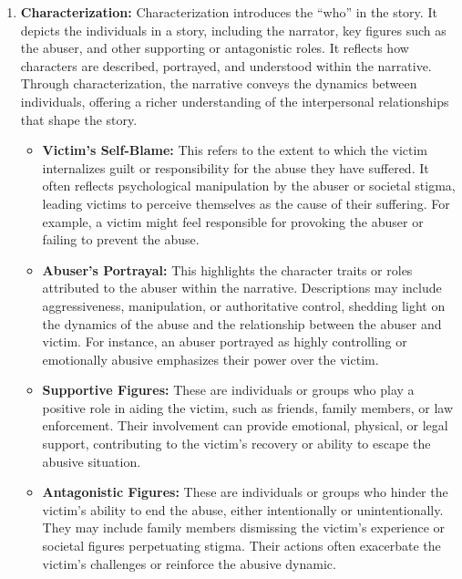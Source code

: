 \documentclass[11pt]{article}
\begin{document}
\begin{enumerate}
    \item \textbf{Characterization: }
    Characterization introduces the ``who'' in the story. 
    It depicts the individuals in a story, including the narrator, key figures such as the abuser, and other supporting or antagonistic roles. 
    It reflects how characters are described, portrayed, and understood within the narrative. 
    Through characterization, the narrative conveys the dynamics between individuals, offering a richer understanding of the interpersonal relationships that shape the story.
    \begin{itemize}
        \item \textbf{Victim's Self-Blame:} This refers to the extent to which the victim internalizes guilt or responsibility for the abuse they have suffered. 
        It often reflects psychological manipulation by the abuser or societal stigma, leading victims to perceive themselves as the cause of their suffering. 
        For example, a victim might feel responsible for provoking the abuser or failing to prevent the abuse.
        \item \textbf{Abuser's Portrayal:} This highlights the character traits or roles attributed to the abuser within the narrative.
        Descriptions may include aggressiveness, manipulation, or authoritative control, shedding light on the dynamics of the abuse and the relationship between the abuser and victim. 
        For instance, an abuser portrayed as highly controlling or emotionally abusive emphasizes their power over the victim.
        \item \textbf{Supportive Figures:} These are individuals or groups who play a positive role in aiding the victim, such as friends, family members, or law enforcement. 
        Their involvement can provide emotional, physical, or legal support, contributing to the victim's recovery or ability to escape the abusive situation.
        \item \textbf{Antagonistic Figures:} These are individuals or groups who hinder the victim's ability to end the abuse, either intentionally or unintentionally. 
        They may include family members dismissing the victim's experience or societal figures perpetuating stigma. 
        Their actions often exacerbate the victim's challenges or reinforce the abusive dynamic.
    \end{itemize}


\end{enumerate}
\end{document}
